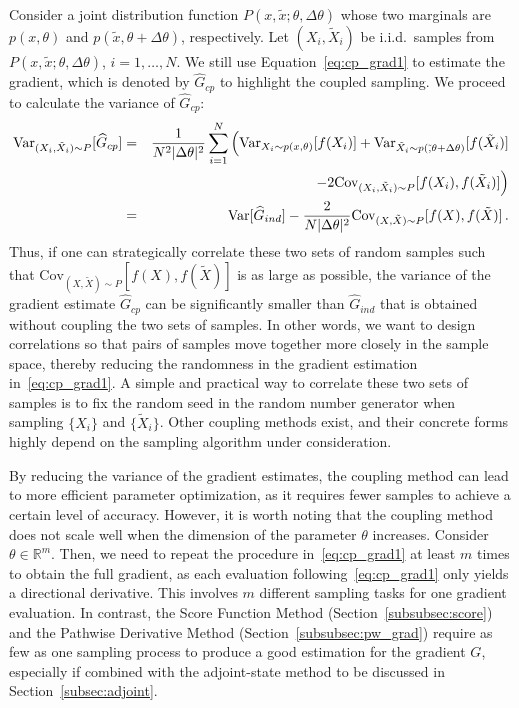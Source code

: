 \documentclass[12pt]{amsart}
\newcommand{\bbR}{\mathbb R} \newcommand{\bbS}{\mathbb S}
\begin{document}
Consider a joint distribution function $P(x,\tilde{x};\theta, \Delta \theta)$ whose two marginals are $p(x,\theta)$ and $p(\tilde{x},\theta+ \Delta \theta)$,  respectively.  Let $(X_i, \tilde{X}_i)$ be i.i.d.~samples from $P(x,\tilde{x};\theta, \Delta \theta)$, $i= 1,\ldots,N$. 
We still use Equation~\eqref{eq:cp_grad1} to estimate the gradient, which is denoted by $\widehat{G}_{cp}$ to highlight the coupled sampling.   We proceed to calculate the variance of $\widehat{G}_{cp}$: 
\begin{eqnarray*}
\text{Var}_{(X_i, \tilde{X}_i) \sim P}[\widehat{G}_{cp}] &=& \frac{1}{N^2 |\Delta \theta|^2} \sum_{i=1}^N 
 \Big( \text{Var}_{X_i\sim p(x,\theta)} [f(X_i)] + \text{Var}_{\tilde X_i\sim p(\tilde,\theta+\Delta \theta)} [f(\tilde X_i)]  \\
&&\hspace{2.5cm} - 2 \text{Cov}_{(X_i, \tilde{X}_i) \sim P} [f(X_i), f(\tilde{X}_i)] \Big) \\
&=& \text{Var}[\widehat{G}_{ind}]   -  \frac{2 }{N  |\Delta \theta|^2} \text{Cov}_{(X, \tilde{X}) \sim P} [f(X), f(\tilde{X})] \,.
\end{eqnarray*}
Thus, if one can strategically correlate these two sets of random samples such that $\text{Cov}_{(X, \tilde{X}) \sim P} [f(X), f(\tilde{X})]$ is as large as possible,   the variance of the gradient estimate $\widehat{G}_{cp}$ can be significantly smaller than $\widehat{G}_{ind}$ that is obtained without coupling the two sets of samples. In other words,  we want to design correlations so that pairs of samples move together more closely in the sample space, thereby reducing the randomness in the gradient estimation in~\eqref{eq:cp_grad1}. A simple and practical way to correlate these two sets of samples is to fix the random seed in the random number generator when sampling $\{X_i\}$ and  $\{\tilde{X}_i\}$. Other coupling methods exist, and their concrete forms highly depend on the sampling algorithm under consideration.

By reducing the variance of the gradient estimates, the coupling method can lead to more efficient parameter optimization, as it requires fewer samples to achieve a certain level of accuracy. However, it is worth noting that the coupling method does not scale well when the dimension of the parameter $\theta$ increases. Consider $\theta \in \bbR^m$. Then, we need to repeat the procedure in~\eqref{eq:cp_grad1} at least $m$ times to obtain the full gradient, as each evaluation following~\eqref{eq:cp_grad1}  only yields a directional derivative. This involves $m$ different sampling tasks for one gradient evaluation. In contrast, the Score Function Method (Section~\ref{subsubsec:score}) and the Pathwise Derivative Method (Section~\ref{subsubsec:pw_grad}) require as few as one sampling process to produce a good estimation for the gradient $G$, especially if combined with the adjoint-state method to be discussed in Section~\ref{subsec:adjoint}.
\end{document}
